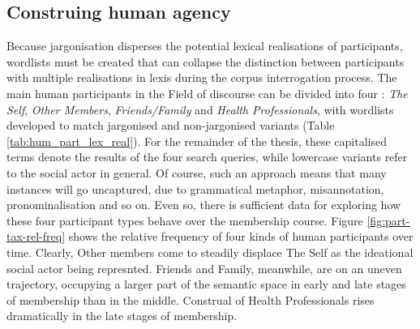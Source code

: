 
\subsection{Construing human agency}

Because jargonisation disperses the potential lexical realisations of participants, wordlists must be created that can collapse the distinction between participants with multiple realisations in lexis during the \gls{corpus} interrogation process. The main human participants \cite[or social actors---see][]{van_leeuwen_representation_1996} in the Field of discourse can be divided into four : \emph{The Self}, \emph{Other Members}, \emph{Friends\slash Family} and \emph{Health Professionals}, with wordlists developed to match jargonised and non\hyp{}jargonised variants (Table \ref{tab:hum_part_lex_real}). For the remainder of the thesis, these capitalised terms denote the results of the four search queries, while lowercase variants refer to the social actor in general. Of course, such an approach means that many instances will go uncaptured, due to grammatical metaphor, misannotation, pronominalisation and so on. Even so, there is sufficient data for exploring how these four participant types behave over the membership course. Figure \ref{fig:part-tax-rel-freq} shows the relative frequency of four kinds of human participants over time. Clearly, Other \Glspl{member} come to steadily displace The Self as the ideational social actor being represnted. Friends and Family, meanwhile, are on an uneven trajectory, occupying a larger part of the semantic space in early and late stages of membership than in the middle. Construal of Health Professionals rises dramatically in the late stages of membership. %

